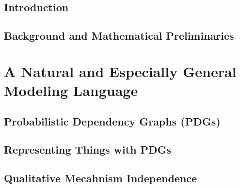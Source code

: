 \documentclass[tocprelim,
    ]{cornellmodified}
\begin{document}
\chapter{Introduction}
    
\chapter{Background and Mathematical Preliminaries}
    

\part{A Natural and Especially General Modeling Language}
    \label{part:univ-model}

\chapter{Probabilistic Dependency Graphs (PDGs)} 
    
    
\chapter{Representing Things with PDGs}
    
     
\chapter{Qualitative Mecahnism Independence}
    

\end{document}
